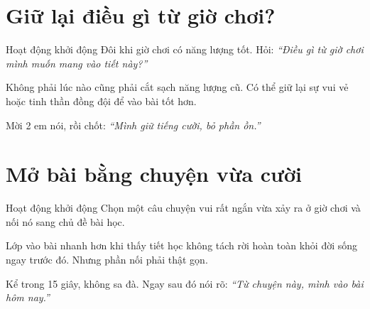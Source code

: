 \section{Giữ lại điều gì từ giờ chơi?}
\begin{khoidongbox}{Hoạt động khởi động}
Đôi khi giờ chơi có năng lượng tốt. Hỏi: \textit{``Điều gì từ giờ chơi mình muốn mang vào tiết này?''}
\end{khoidongbox}
\begin{visaohieuqua}
Không phải lúc nào cũng phải cắt sạch năng lượng cũ. Có thể giữ lại sự vui vẻ hoặc tinh thần đồng đội để vào bài tốt hơn.
\end{visaohieuqua}
\begin{cachlam5phut}
Mời 2 em nói, rồi chốt: \textit{``Mình giữ tiếng cười, bỏ phần ồn.''}
\end{cachlam5phut}
\ngancach

\section{Mở bài bằng chuyện vừa cười}
\begin{khoidongbox}{Hoạt động khởi động}
Chọn một câu chuyện vui rất ngắn vừa xảy ra ở giờ chơi và nối nó sang chủ đề bài học.
\end{khoidongbox}
\begin{visaohieuqua}
Lớp vào bài nhanh hơn khi thấy tiết học không tách rời hoàn toàn khỏi đời sống ngay trước đó. Nhưng phần nối phải thật gọn.
\end{visaohieuqua}
\begin{cachlam5phut}
Kể trong 15 giây, không sa đà. Ngay sau đó nói rõ: \textit{``Từ chuyện này, mình vào bài hôm nay.''}
\end{cachlam5phut}